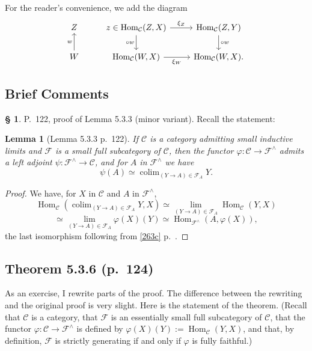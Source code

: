\documentclass[12pt]{article}
\newtheorem{lem}[thm]{Lemma}
\theoremstyle{remark}
\theoremstyle{definition}
\newtheorem{s}[thm]{\S}
\newcommand{\C}{\mathcal C}
\newcommand{\F}{\mathcal F}
\newcommand{\pp}{\varphi}
\DeclareMathOperator*{\colim}{colim}
\DeclareMathOperator{\Hom}{Hom}
\begin{document}
For the reader's convenience, we add the diagram 
$$
\begin{tikzcd}
Z&z\in\Hom_\C(Z,X)\ar{r}{\xi_Z}\ar{d}[swap]{\circ w}&\Hom_\C(Z,Y)\ar{d}{\circ w}\\ 
W\ar{u}{w}&\Hom_\C(W,X)\ar{r}[swap]{\xi_W}&\Hom_\C(W,X).
\end{tikzcd}
$$


\subsection{Brief Comments} 

\begin{s} 
P.~122, proof of Lemma 5.3.3 (minor variant). Recall the statement: 

\begin{lem}[Lemma 5.3.3 p.~122] 
If $\C$ is a category admitting small inductive limits and $\F$ is a small full subcategory of $\C$, then the functor $\pp:\C\to\F^\wedge$ admits a left adjoint $\psi:\F^\wedge\to\C$, and for $A$ in $\F^\wedge$ we have 
$$
\psi(A)\simeq\colim_{(Y\to A)\in\F_A}Y. 
$$ 
\end{lem} 

\begin{proof}
We have, for $X$ in $\C$ and $A$ in $\F^\wedge$, 
$$
\Hom_\C\left(\colim_{(Y\to A)\in\F_A}Y,X\right)\simeq\lim_{(Y\to A)\in\F_A}\Hom_\C(Y,X)
$$ 
$$
\simeq\lim_{(Y\to A)\in\F_A}\pp(X)(Y)\simeq\Hom_{\F^\wedge}(A,\pp(X)),
$$  
the last isomorphism following from \eqref{263c} p.~\pageref{263c}.
\end{proof}
\end{s}


\subsection{Theorem 5.3.6 (p.~124)} 

As an exercise, I rewrite parts of the proof. The difference between the rewriting and the original proof is very slight. Here is the statement of the theorem. (Recall that $\C$ is a category, that $\F$ is an essentially small full subcategory of $\C$, that the functor $\pp:\C\to\F^\wedge$ is defined by $\pp(X)(Y):=\Hom_\C(Y,X)$, and that, by definition, $\F$ is strictly generating if and only if $\pp$ is fully faithful.)
\end{document}
